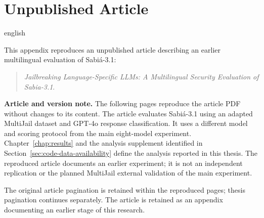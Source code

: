 \chapter{Unpublished Article}

\begin{otherlanguage*}{english}

This appendix reproduces an unpublished article describing an earlier multilingual evaluation of Sabiá-3.1:

\begin{quote}
\textit{Jailbreaking Language-Specific LLMs: A Multilingual Security Evaluation of Sabia-3.1}.
\end{quote}

\noindent\textbf{Article and version note.}
The following pages reproduce the article PDF without changes to its content. The article evaluates Sabiá-3.1 using an adapted MultiJail dataset and GPT-4o response classification. It uses a different model and scoring protocol from the main eight-model experiment. Chapter~\ref{chap:results} and the analysis supplement identified in Section~\ref{sec:code-data-availability} define the analysis reported in this thesis. The reproduced article documents an earlier experiment; it is not an independent replication or the planned MultiJail external validation of the main experiment.

The original article pagination is retained within the reproduced pages; thesis pagination continues separately. The article is retained as an appendix documenting an earlier stage of this research.

\end{otherlanguage*}

